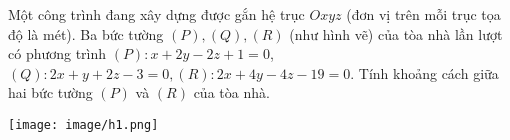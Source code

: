 \begin{ex}%
	Một công trình đang xây dựng được gắn hệ trục $Oxyz$ (đơn vị trên mỗi trục tọa độ là mét). Ba bức tường $(P),(Q),(R)$ (như hình vẽ) của tòa nhà lần lượt có phương trình $(P)\colon x+2y-2z+1=0$, $(Q)\colon 2x+y+2z-3=0,(R)\colon 2x+4y-4z-19=0$. Tính khoảng cách giữa hai bức tường $(P)$ và $(R)$ của tòa nhà.
	\begin{center}
			\texttt{[image: image/h1.png]}
	\end{center}
\end{ex}


